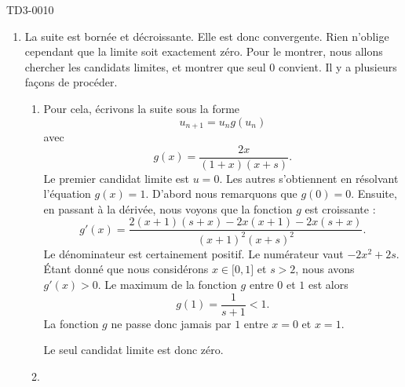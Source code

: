 \begin{corrige}{TD3-0010}
\begin{enumerate}
    \item 

        La suite est bornée et décroissante. Elle est donc convergente. Rien n'oblige cependant que la limite soit exactement zéro. Pour le montrer, nous allons chercher les candidats limites, et montrer que seul \( 0\) convient. Il y a plusieurs façons de procéder.
        
        \begin{enumerate}
            \item
        
        Pour cela, écrivons la suite sous la forme
        \begin{equation}
            u_{n+1}=u_ng(u_n)
        \end{equation}
        avec
        \begin{equation}
            g(x)=\frac{2x}{(1+x)(x+s)}.
        \end{equation}
        Le premier candidat limite est \( u=0\). Les autres s'obtiennent en résolvant l'équation \( g(x)=1\). D'abord nous remarquons que \( g(0)=0\). Ensuite, en passant à la dérivée, nous voyons que la fonction \( g\) est croissante :
        \begin{equation}
            g'(x)=\frac{ 2(x+1)(s+x)-2x(x+1)-2x(s+x) }{ (x+1)^2(x+s)^2 }.
        \end{equation}
        Le dénominateur est certainement positif. Le numérateur vaut \( -2x^2+2s\). Étant donné que nous considérons \( x\in\mathopen[ 0 , 1 \mathclose]\) et \( s>2\), nous avons \( g'(x)>0\). Le maximum de la fonction \( g\) entre \( 0\) et \( 1\) est alors
        \begin{equation}
            g(1)=\frac{1}{ s+1 }<1.
        \end{equation}
        La fonction $g$ ne passe donc jamais par \( 1\) entre \( x=0\) et \( x=1\).

        Le seul candidat limite est donc zéro. 
        
            \item


\end{enumerate}
\end{enumerate}
\end{corrige}
